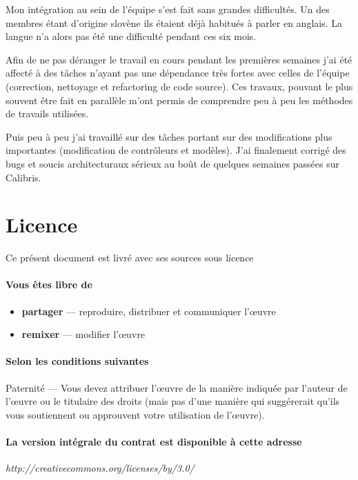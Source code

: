 \documentclass[12pt,a4paper]{book}
\begin{document}
Mon intégration au sein de l'équipe s'est fait sans grandes difficultés. Un des membres étant d'origine slovène ils étaient déjà habitués à parler en anglais. La langue n'a alors pas été une difficulté pendant ces six mois.

Afin de ne pas déranger le travail en cours pendant les premières semaines j'ai été affecté à des tâches n'ayant pas une dépendance très fortes avec celles de l'équipe (correction, nettoyage et refactoring de code source). Ces travaux, pouvant le plus souvent être fait en parallèle m'ont permis de comprendre peu à peu les méthodes de travails utilisées.

Puis peu à peu j'ai travaillé sur des tâches portant sur des modifications plus importantes (modification de contrôleurs et modèles). J'ai finalement corrigé des bugs et soucis architecturaux sérieux au boût de quelques semaines passées sur Calibris. 

\listoffigures

\printglossaries

\newpage
{}
\section*{Licence}
\begin{center}
Ce présent document est livré avec ses sources sous licence\\
\end{center}

\paragraph*{Vous êtes libre de}

\begin{itemize}
\item \textbf{partager} — reproduire, distribuer et communiquer l'\oe uvre
\item \textbf{remixer} — modifier l'\oe uvre
\end{itemize}

\paragraph*{Selon les conditions suivantes}
Paternité — Vous devez attribuer l'\oe uvre de la manière indiquée par l'auteur de l'\oe uvre ou le titulaire des droits (mais pas d'une manière qui suggérerait qu'ils vous soutiennent ou approuvent votre utilisation de l'\oe uvre). 

\paragraph*{La version intégrale du contrat est disponible à cette adresse}

\begin{center}
\textit{http://creativecommons.org/licenses/by/3.0/}
\end{center}
\end{document}
